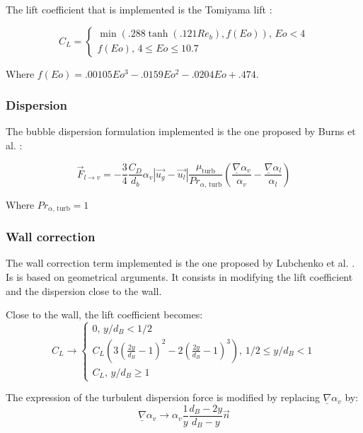 The lift coefficient that is implemented is the Tomiyama lift \cite{Tomiyama2002}:

\begin{equation}
	C_L = \begin{cases} \min(.288\tanh(.121Re_b),f(Eo)) \text{,~} Eo<4 \\ f(Eo) \text{,~} 4 \leq Eo \leq 10.7 \end{cases}
\end{equation}

Where $f(Eo) = .00105Eo^3 - .0159Eo^2 - .0204 Eo + .474$.

\subsubsection{Dispersion}

The bubble dispersion formulation implemented is the one proposed by Burns et al. \cite{Burns2004}:

\begin{equation}
\vec{F}_{l\rightarrow v} = -\frac{3}{4} \frac{C_D}{d_b}\alpha_v|\vec{u_g}-\vec{u_l}|\frac{\mu_{\text{turb}}}{Pr_{\alpha\text{, turb}}}
\left(\frac{\underline{\nabla}\alpha_v}{\alpha_v}-\frac{\underline{\nabla}\alpha_l}{\alpha_l}\right)
\end{equation}

Where $Pr_{\alpha\text{, turb}}=1$

\subsubsection{Wall correction}

The wall correction term implemented is the one proposed by Lubchenko et al. \cite{Lubchenko2018}. Is is based on geometrical arguments. It consists in modifying the lift coefficient and the dispersion close to the wall.

Close to the wall, the lift coefficient becomes:
\begin{equation}
	C_L \rightarrow \begin{cases} 0 \text{,~} y/d_B<1/2  \\
	C_L\left(3\left(\frac{2y}{d_B}-1\right)^2-2\left(\frac{2y}{d_B}-1\right)^3\right) \text{,~} 1/2 \leq y/d_B < 1 \\
	C_L \text{,~} y/d_B\geq 1 \end{cases}
\end{equation}

The expression of the turbulent dispersion force is modified by replacing $\underline{\nabla}\alpha_v$ by:
\begin{equation}
	 \underline{\nabla}\alpha_v \rightarrow \alpha_v\frac{1}{y}\frac{d_B-2y}{d_B-y}\overrightarrow{n}
\end{equation}

